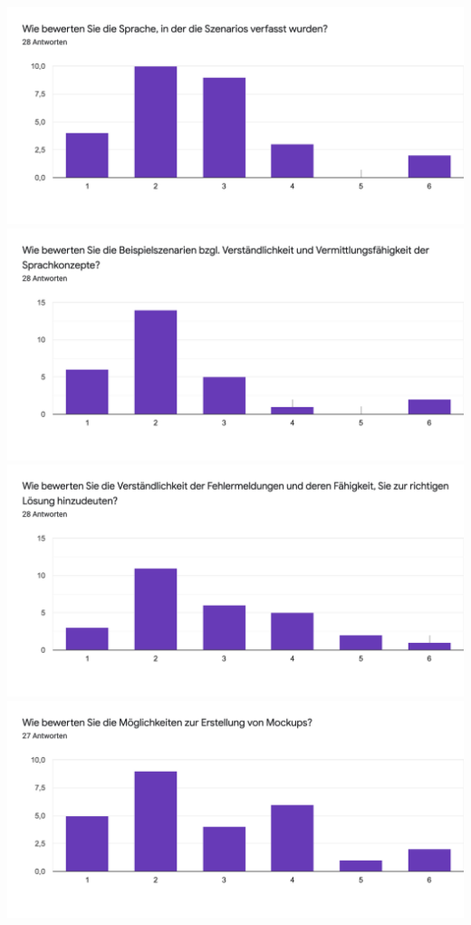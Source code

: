 \includegraphics[width=\textwidth]{images/language.png}
\includegraphics[width=\textwidth]{images/examples.png}
\includegraphics[width=\textwidth]{images/errors.png}
\includegraphics[width=\textwidth]{images/mockups.png}
